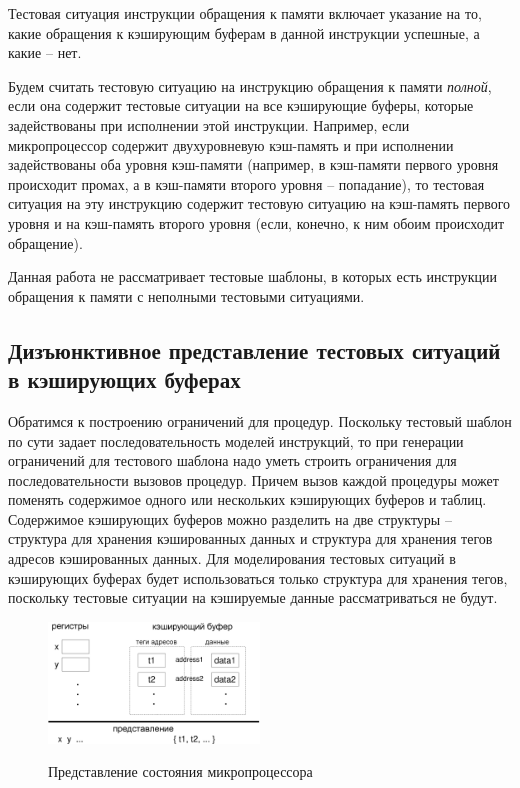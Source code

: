 Тестовая ситуация инструкции обращения к памяти включает указание на
то, какие обращения к кэширующим буферам в данной инструкции
успешные, а какие -- нет.

Будем считать тестовую ситуацию на инструкцию обращения к памяти
\emph{полной}, если она содержит тестовые ситуации на все кэширующие
буферы, которые задействованы при исполнении этой инструкции.
Например, если микропроцессор содержит двухуровневую кэш-память и
при исполнении задействованы оба уровня кэш-памяти (например, в
кэш-памяти первого уровня происходит промах, а в кэш-памяти второго
уровня -- попадание), то тестовая ситуация на эту инструкцию
содержит тестовую ситуацию на кэш-память первого уровня и на
кэш-память второго уровня (если, конечно, к ним обоим происходит
обращение).

Данная работа не рассматривает тестовые шаблоны, в которых есть
инструкции обращения к памяти с неполными тестовыми ситуациями.

\subsection{Дизъюнктивное представление тестовых ситуаций в
кэширующих буферах}

Обратимся к построению ограничений для процедур. Поскольку тестовый
шаблон по сути задает последовательность моделей инструкций, то при
генерации ограничений для тестового шаблона надо уметь строить
ограничения для последовательности вызовов процедур. Причем вызов
каждой процедуры может поменять содержимое одного или нескольких
кэширующих буферов и таблиц. Содержимое кэширующих буферов можно
разделить на две структуры -- структура для хранения кэшированных
данных и структура для хранения тегов адресов кэшированных данных.
Для моделирования тестовых ситуаций в кэширующих буферах будет
использоваться только структура для хранения тегов, поскольку
тестовые ситуации на кэшируемые данные рассматриваться не будут.

\begin{figure}[h] \center
  \includegraphics[width=0.5\textwidth]{2.theor/mpset}\\
  \caption{Представление состояния микропроцессора}\label{mpset}
\end{figure}


